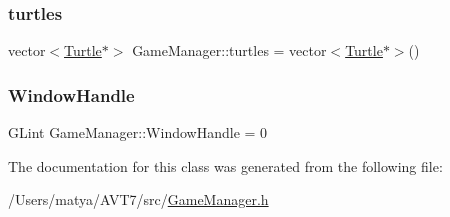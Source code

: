 \subsubsection{\texorpdfstring{turtles}{turtles}}
{\footnotesize\ttfamily vector$<$\hyperlink{class_turtle}{Turtle}$\ast$$>$ Game\+Manager\+::turtles = vector$<$\hyperlink{class_turtle}{Turtle}$\ast$$>$()}

\mbox{\label{class_game_manager_a7292d1f46ee4141dbb1b6a7a8cc134f2}} 
\subsubsection{\texorpdfstring{Window\+Handle}{WindowHandle}}
{\footnotesize\ttfamily G\+Lint Game\+Manager\+::\+Window\+Handle = 0}



The documentation for this class was generated from the following file\+:\begin{DoxyCompactItemize}
\item 
/\+Users/matya/\+A\+V\+T7/src/\hyperlink{_game_manager_8h}{Game\+Manager.\+h}\end{DoxyCompactItemize}
